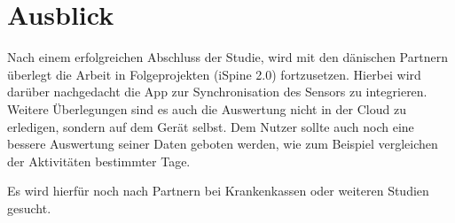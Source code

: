 \chapter{Ausblick}
Nach einem erfolgreichen Abschluss der Studie, wird mit den dänischen Partnern überlegt die Arbeit in Folgeprojekten (iSpine 2.0) fortzusetzen. Hierbei wird darüber nachgedacht die App zur Synchronisation des Sensors zu integrieren. Weitere Überlegungen sind es auch die Auswertung nicht in der Cloud zu erledigen, sondern auf dem Gerät selbst. Dem Nutzer sollte auch noch eine bessere Auswertung seiner Daten geboten werden, wie zum Beispiel vergleichen der Aktivitäten bestimmter Tage.

Es wird hierfür noch nach Partnern bei Krankenkassen oder weiteren Studien gesucht.

